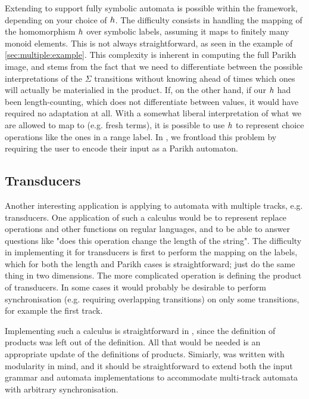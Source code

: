 \documentclass[acmsmall,review,anonymous,screen]{acmart}\settopmatter{printfolios=true,printccs=false,printacmref=true}
\theoremstyle{definition}
\begin{document}
Extending \Calculus{} to support fully symbolic automata is possible within the
framework, depending on your choice of $h$. The difficulty consists in
handling the mapping of the homomorphism $h$ over symbolic labels, assuming
it maps to finitely many monoid elements. This is not always straightforward, as
seen in the example of \cref{sec:multiple:example}. This complexity is inherent
in computing the full Parikh image, and stems from the fact that we need to
differentiate between the possible interpretations of the $\Sigma$ transitions
without knowing ahead of times which ones will actually be materialied in the
product. If, on the other hand, if our $h$ had been length-counting, which
does not differentiate between values, it would have required no adaptation at
all. With a somewhat liberal interpretation of what we are allowed to map to
(e.g. fresh terms), it is possible to use $h$ to represent choice operations
like the ones in a range label. In \Catra{}, we frontload this problem by
requiring the user to encode their input as a Parikh automaton. 

\subsection{Transducers}\label{sec:ext:transducers}

Another interesting application is applying \Calculus{} to automata with
multiple tracks, e.g. transducers. One application of such a calculus would be
to represent replace operations and other functions on regular languages, and to
be able to answer questions like "does this operation change the length of the
string". The difficulty in implementing it for transducers is first to perform
the mapping on the labels, which for both the length and Parikh cases is
straightforward; just do the same thing in two dimensions. The more complicated
operation is defining the product of transducers. In some cases it would
probably be desirable to perform synchronisation (e.g. requiring overlapping
transitions) on only some transitions, for example the first track.

Implementing such a calculus is straightforward in \Calculus, since the
definition of products was left out of the definition. All that would be needed
is an appropriate update of the definitions of products. Simiarly, \Catra was
written with modularity in mind, and it should be straightforward to extend both
the input grammar and automata implementations to accommodate multi-track
automata with arbitrary synchronisation.
\end{document}
